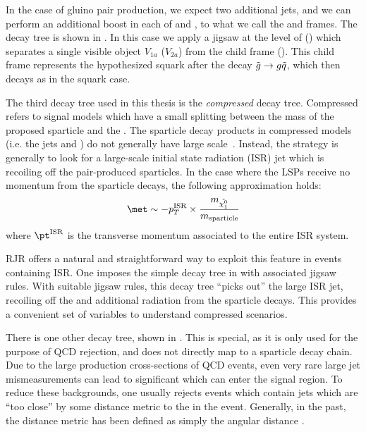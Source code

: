 In the case of gluino pair production, we expect two additional jets, and we can perform an additional boost in each of \Pa and \Pb, to what we call the \Ca and \Cb frames.
The decay tree is shown in .
In this case we apply a jigsaw at the level of \Pa (\Pb) which separates a single visible object $V_{1a}$ ($V_{2a}$) from the child frame \Ca (\Cb).
This child frame represents the hypothesized squark after the decay $\tilde{g} \rightarrow g \tilde{q}$, which then decays as in the squark case.

The third decay tree used in this thesis is the \textit{compressed} decay tree.
Compressed refers to signal models which have a small splitting between the mass of the proposed sparticle and the \lsp.
The sparticle decay products in compressed models (i.e. the jets and \met) do not generally have large scale~\cite{Jackson:2016mfb}.
Instead, the strategy is generally to look for a large-scale initial state radiation (ISR) jet which is recoiling off the pair-produced sparticles.
In the case where the LSPs receive no momentum from the sparticle decays, the following approximation holds:
\begin{align}
\met \order -p_T^{\text{ISR}} \times \frac{m_{\lsp} }{m_{\text{sparticle}}}
\end{align}
where $\pt^{\text{ISR}}$ is the transverse momentum associated to the entire ISR system.

RJR offers a natural and straightforward way to exploit this feature in events containing ISR.
One imposes the simple decay tree in  with associated jigsaw rules.
With suitable jigsaw rules, this decay tree ``picks out'' the large \pt ISR jet, recoiling off the \met and additional radiation from the sparticle decays.
This provides a convenient set of variables to understand compressed scenarios.

There is one other decay tree, shown in .
This is special, as it is only used for the purpose of QCD rejection, and does not directly map to a sparticle decay chain.
Due to the large production cross-sections of QCD events, even very rare large jet mismeasurements can lead to significant \met which can enter the signal region.
To reduce these backgrounds, one usually rejects events which contain jets which are ``too close'' by some distance metric to the \met in the event.
Generally, in the past, the distance metric has been defined as simply the angular distance \deltaR.

